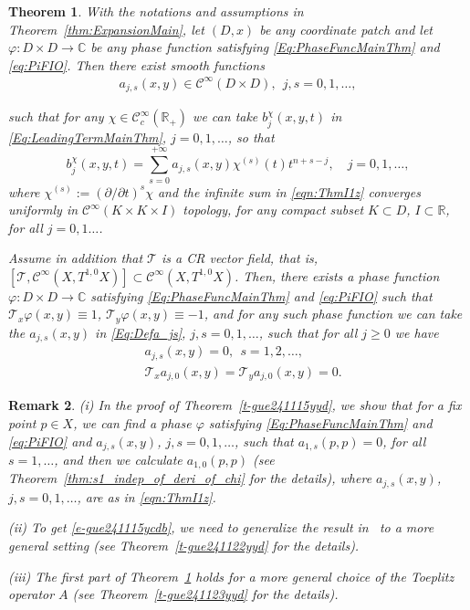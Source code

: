 \documentclass[12pt]{amsart}
\newtheorem{theorem}{Theorem}[section]
\newtheorem{remark}[theorem]{Remark}
\theoremstyle{definition}
\theoremstyle{named}
\numberwithin{equation}{subsection}
\newcommand{\R}{\mathbb{R}}
\newcommand{\C}{\mathbb{C}}
\def\cC{\mathscr{C}}
\begin{document}
\begin{theorem}\label{t-gue241115ycd}
With the notations and assumptions in Theorem~\ref{thm:ExpansionMain}, let $(D,x)$ be any coordinate patch and let 
$\varphi:D\times D\to\C$ be any phase function satisfying 
\eqref{Eq:PhaseFuncMainThm} and \eqref{eq:PiFIO}. Then there exist smooth functions
\begin{eqnarray}\label{Eq:Defa_js}
a_{j,s}(x,y)\in\cC^\infty(D\times D),\ \ j,s=0,1,\ldots,
\end{eqnarray}


such that for any \(\chi\in \mathscr{C}^\infty_c(\R_+)\) we can take $b^\chi_j(x,y,t)$ in \eqref{Eq:LeadingTermMainThm}, $j=0,1,\ldots$, so that 
\begin{equation}\label{eqn:ThmI1z}
    b^\chi_j(x,y,t)=\sum^{+\infty}_{s=0}a_{j,s}(x,y)\chi^{(s)}(t)t^{n+s-j},\quad j=0,1,\ldots,
\end{equation}
where \(\chi^{(s)}:=(\partial/\partial t)^s\chi\) and the infinite sum in \eqref{eqn:ThmI1z} converges uniformly in $\cC^{\infty}(K\times K\times I)$ topology, for any compact subset $K\subset D$, $I\subset\mathbb R$, for all $j=0,1\dots$. 

Assume in addition that $\mathcal{T}$ is a CR vector field, that is, $[\mathcal{T},\cC^\infty(X,T^{1,0}X)]\subset\cC^\infty(X,T^{1,0}X)$.  Then, there exists a phase function 
$\varphi:D\times D\to\C$  satisfying 
\eqref{Eq:PhaseFuncMainThm} and \eqref{eq:PiFIO} such that 
$\mathcal{T}_x\varphi(x,y)\equiv1$, $\mathcal{T}_y\varphi(x,y)\equiv-1$, and for any such phase function we can take the $a_{j,s}(x,y)$ in \eqref{Eq:Defa_js}, $j,s=0,1,\ldots$, such that for all \(j\geq 0\) we have
\begin{equation}\label{e-gue241116yyd}
\begin{split}
&a_{j,s}(x,y)=0,\ \ s=1,2,\ldots,\\
&\mathcal{T}_xa_{j,0}(x,y)=\mathcal{T}_ya_{j,0}(x,y)=0. 
\end{split}
\end{equation}
\end{theorem}

\begin{remark}\label{r-gue241119yyd}
(i) In the proof of Theorem~\ref{t-gue241115yyd}, we show that for a fix point $p\in X$, we can find a phase $\varphi$ satisfying \eqref{Eq:PhaseFuncMainThm} and \eqref{eq:PiFIO} and $a_{j,s}(x,y)$, $j, s=0,1,\ldots$, such that $a_{1,s}(p,p)=0$, for all $s=1,\ldots$, and then we calculate $a_{1,0}(p,p)$ (see Theorem~\ref{thm:s1_indep_of_deri_of_chi} for the details), where $a_{j,s}(x,y)$, $j, s=0,1,\ldots$, are as in \eqref{eqn:ThmI1z}. 

(ii) To get \eqref{e-gue241115ycdb}, we need to generalize the result in~\cite{Hsiao_Shen_2nd_coefficient_BS_2020} to a more general setting (see Theorem~\ref{t-gue241122yyd} for the details). 

(iii) The first part of Theorem~\ref{t-gue241115ycd} holds for a more general choice of the Toeplitz operator \(A\) (see Theorem~\ref{t-gue241123yyd} for the details).  
\end{remark}
\end{document}
